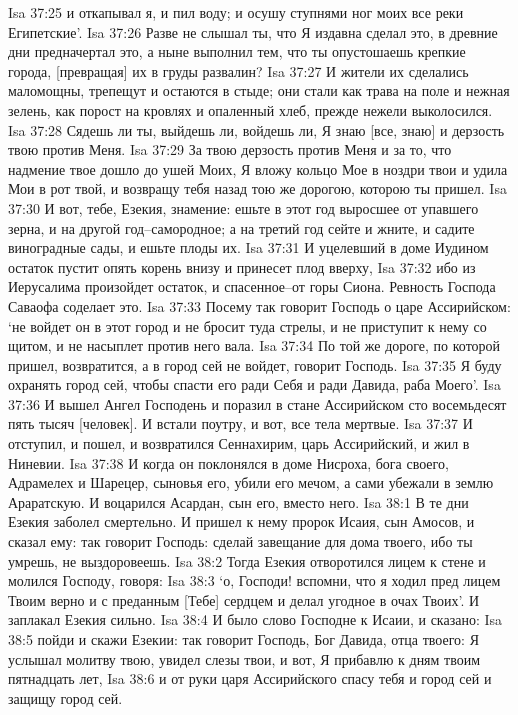 Isa 37:25  и откапывал я, и пил воду; и осушу ступнями ног моих все реки Египетские'.
Isa 37:26  Разве не слышал ты, что Я издавна сделал это, в древние дни предначертал это, а ныне выполнил тем, что ты опустошаешь крепкие города, [превращая] их в груды развалин?
Isa 37:27  И жители их сделались маломощны, трепещут и остаются в стыде; они стали как трава на поле и нежная зелень, как порост на кровлях и опаленный хлеб, прежде нежели выколосился.
Isa 37:28  Сядешь ли ты, выйдешь ли, войдешь ли, Я знаю [все, знаю] и дерзость твою против Меня.
Isa 37:29  За твою дерзость против Меня и за то, что надмение твое дошло до ушей Моих, Я вложу кольцо Мое в ноздри твои и удила Мои в рот твой, и возвращу тебя назад тою же дорогою, которою ты пришел.
Isa 37:30  И вот, тебе, Езекия, знамение: ешьте в этот год выросшее от упавшего зерна, и на другой год--самородное; а на третий год сейте и жните, и садите виноградные сады, и ешьте плоды их.
Isa 37:31  И уцелевший в доме Иудином остаток пустит опять корень внизу и принесет плод вверху,
Isa 37:32  ибо из Иерусалима произойдет остаток, и спасенное--от горы Сиона. Ревность Господа Саваофа соделает это.
Isa 37:33  Посему так говорит Господь о царе Ассирийском: `не войдет он в этот город и не бросит туда стрелы, и не приступит к нему со щитом, и не насыплет против него вала.
Isa 37:34  По той же дороге, по которой пришел, возвратится, а в город сей не войдет, говорит Господь.
Isa 37:35  Я буду охранять город сей, чтобы спасти его ради Себя и ради Давида, раба Моего'.
Isa 37:36  И вышел Ангел Господень и поразил в стане Ассирийском сто восемьдесят пять тысяч [человек]. И встали поутру, и вот, все тела мертвые.
Isa 37:37  И отступил, и пошел, и возвратился Сеннахирим, царь Ассирийский, и жил в Ниневии.
Isa 37:38  И когда он поклонялся в доме Нисроха, бога своего, Адрамелех и Шарецер, сыновья его, убили его мечом, а сами убежали в землю Араратскую. И воцарился Асардан, сын его, вместо него.
Isa 38:1  В те дни Езекия заболел смертельно. И пришел к нему пророк Исаия, сын Амосов, и сказал ему: так говорит Господь: сделай завещание для дома твоего, ибо ты умрешь, не выздоровеешь.
Isa 38:2  Тогда Езекия отворотился лицем к стене и молился Господу, говоря:
Isa 38:3  `о, Господи! вспомни, что я ходил пред лицем Твоим верно и с преданным [Тебе] сердцем и делал угодное в очах Твоих'. И заплакал Езекия сильно.
Isa 38:4  И было слово Господне к Исаии, и сказано:
Isa 38:5  пойди и скажи Езекии: так говорит Господь, Бог Давида, отца твоего: Я услышал молитву твою, увидел слезы твои, и вот, Я прибавлю к дням твоим пятнадцать лет,
Isa 38:6  и от руки царя Ассирийского спасу тебя и город сей и защищу город сей.
